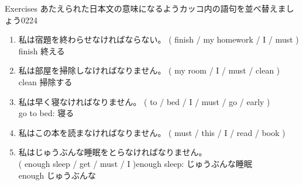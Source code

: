 \documentclass[aspectratio=169,xcolor={dvipsnames,table}]{beamer}
\newcommand{\myaudio}[1]{\href{#1}{\faVolumeUp}}
\begin{document}
\begin{frame}[plain]{Exercises}
あたえられた日本文の意味になるようカッコ内の語句を並べ替えましょう\hfill{\tiny 0224}\,{\scriptsize \myaudio{./audio/013_must_02.mp3}}
\begin{enumerate}
 \item {\small 私は宿題を終わらせなければならない。}
( finish / my homework / I / must )\\
\hfill{}{\scriptsize finish  終える}
 \item {\small 私は部屋を掃除しなければなりません。}
( my room / I / must / clean )\\
\hfill{\scriptsize clean  掃除する}
 \item {\small 私は早く寝なければなりません。}
( to / bed / I / must / go / early )\\
\hfill{}{\scriptsize go to bed: 寝る}
 \item {\small 私はこの本を読まなければなりません。}
( must / this / I / read / book )\\
 \item {\small 私はじゅうぶんな睡眠をとらなければなりません。}\\
( enough sleep / get / must / I )\hfill{\scriptsize enough sleep: じゅうぶんな睡眠}\\
\hfill{}{\scriptsize enough  じゅうぶんな}
\end{enumerate}
\end{frame}
\end{document}
